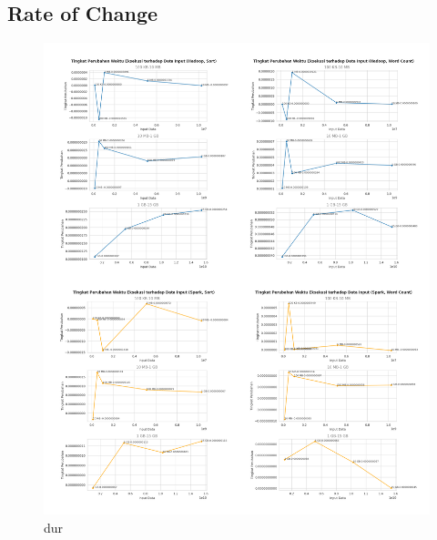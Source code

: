 \subsection{Rate of Change}

\begin{figure}[h]
    \centering
    \includegraphics[width=1.1\textwidth]{figures/ch04/3-grup-dur.png}
    \caption{dur}
    \label{fig:3-grup-dur}
\end{figure}

